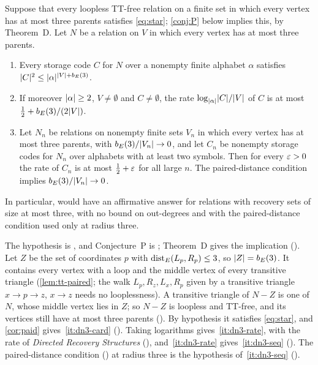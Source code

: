 \begin{proposition}\label{prop:dn3-transfer}
Suppose that every loopless TT-free relation on a finite set in which every vertex has at most three parents satisfies
\eqref{eq:star}; \cref{conj:P} below implies this, by Theorem~D. Let $N$ be a relation on $V$ in which every vertex has at
most three parents.
\begin{enumerate}[label=(\alph*)]
\item\label{it:dn3-card} Every storage code $C$ for $N$ over a nonempty finite alphabet $\alpha$ satisfies
$\lvert C \rvert^2\le\lvert \alpha \rvert^{\lvert V \rvert+b_E(3)}$.
\item\label{it:dn3-rate} If moreover $\lvert \alpha \rvert\ge2$, $V\ne\emptyset$ and $C\ne\emptyset$, the rate
$\log_{\lvert \alpha \rvert}\lvert C \rvert/\lvert V \rvert$ of $C$ is at most $\frac12+b_E(3)/(2\lvert V \rvert)$.
\item\label{it:dn3-seq} Let $N_n$ be relations on nonempty finite sets $V_n$ in which every vertex has at most three
parents, with $b_E(3)/\lvert V_n \rvert\to0$, and let $C_n$ be nonempty storage codes for $N_n$ over alphabets with at least two
symbols. Then for every $\varepsilon>0$ the rate of $C_n$ is at most $\frac12+\varepsilon$ for all large $n$. The paired-distance
condition implies $b_E(3)/\lvert V_n \rvert\to0$.
\end{enumerate}
In particular, \cite[Question~9.1]{DirectedRecovery2026} would have an affirmative answer for relations with recovery
sets of size at most three, with no bound on out-degrees and with the paired-distance condition used only at radius
three.
\end{proposition}

\begin{outline}
The hypothesis is , and Conjecture~P is ; Theorem~D gives the implication
(). Let $Z$ be the set of coordinates $p$ with $\operatorname{dist}_E(L_p,R_p)\le3$, so $\lvert Z \rvert=b_E(3)$. It
contains every vertex with a loop and the middle vertex of every transitive triangle (\cref{lem:tt-paired}; the walk
$L_p,R_z,L_x,R_p$ given by a transitive triangle $x\to p\to z$, $x\to z$ needs no looplessness). A transitive triangle
of $N-Z$ is one of $N$, whose middle vertex lies in $Z$; so $N-Z$ is loopless and TT-free, and its vertices still have at
most three parents (). By hypothesis it satisfies \eqref{eq:star}, and \cref{cor:paid}
gives~\ref{it:dn3-card} (). Taking logarithms gives~\ref{it:dn3-rate}, with the rate
 of \emph{Directed Recovery Structures} (),
and~\ref{it:dn3-rate} gives~\ref{it:dn3-seq} (). The paired-distance condition
() at radius three is the hypothesis of~\ref{it:dn3-seq}
().
\end{outline}

